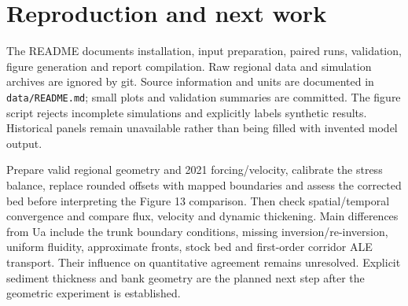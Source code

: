 \documentclass[11pt]{article}
\begin{document}
\section{Reproduction and next work}
The README documents installation, input preparation, paired runs, validation,
figure generation and report compilation. Raw regional data and simulation
archives are ignored by git. Source information and units are documented in
\texttt{data/README.md}; small plots and validation summaries are committed.
The figure script rejects incomplete simulations and explicitly labels synthetic
results. Historical panels remain unavailable rather than being filled with
invented model output.

Prepare valid regional geometry and 2021 forcing/velocity, calibrate the stress
balance, replace rounded offsets with mapped boundaries and assess the corrected
bed before interpreting the Figure 13 comparison. Then check spatial/temporal
convergence and compare flux, velocity and dynamic thickening. Main differences
from Ua include the trunk boundary conditions, missing inversion/re-inversion,
uniform fluidity, approximate fronts, stock bed and first-order corridor ALE
transport. Their influence on quantitative agreement remains unresolved.
Explicit sediment thickness and bank geometry are the planned next step after
the geometric experiment is established.
\end{document}
